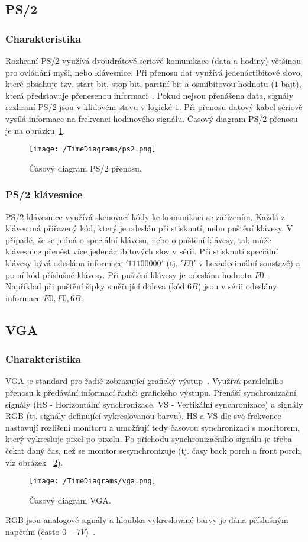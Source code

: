 \documentclass{report}
\begin{document}
\subsection{PS/2}\label{sec:ps2}
\subsubsection{Charakteristika}
Rozhraní PS/2 využívá dvoudrátové sériové komunikace (data a hodiny) většinou pro ovládání myši, nebo klávesnice. Při přenosu dat využívá jedenáctibitové slovo, které obsahuje tzv. start bit, stop bit, paritní bit a osmibitovou hodnotu ($1$ bajt), která představuje přenesenou informaci~\cite{ibmpc}. Pokud nejsou přenášena data, signály rozhraní PS/2 jsou v klidovém stavu v logické $1$. Při přenosu datový kabel sériově vysílá informace na frekvenci hodinového signálu. Časový diagram PS/2 přenosu je na obrázku~\ref{fig:ps2timing}.
\begin{figure}
\centering
\texttt{[image: /TimeDiagrams/ps2.png]}
\caption{Časový diagram PS/2 přenosu.}
\label{fig:ps2timing}
\end{figure}
\subsubsection{PS/2 klávesnice}
PS/2 klávesnice využívá skenovací kódy ke komunikaci se zařízením. Každá z kláves má přiřazený kód, který je odeslán při stisknutí, nebo puštění klávesy. V případě, že se jedná o speciální klávesu, nebo o puštění klávesy, tak může klávesnice přenést více jedenáctibitových slov v sérii. Při stisknutí speciální klávesy bývá odeslána informace $'11100000'$ (tj. $'E0'$ v hexadecimální soustavě) a po ní kód příslušné klávesy. Při puštění klávesy je odeslána hodnota $F0$. Například při puštění šipky směřující doleva (kód $6B$) jsou v sérii odeslány informace $E0,F0,6B$.
\subsection{VGA}\label{sec:vga}
\subsubsection{Charakteristika}
VGA je standard pro řadič zobrazující grafický výstup~\cite{ibmpc}. Využívá paralelního přenosu k předávání informací řadiči grafického výstupu. Přenáší synchronizační signály (HS - Horizontální synchronizace, VS - Vertikální synchronizace) a signály RGB (tj. signály definující vykreslovanou barvu). HS a VS dle své frekvence nastavují rozlišení monitoru a umožňují tedy časovou synchronizaci s monitorem, který vykresluje pixel po pixelu. Po příchodu synchronizačního signálu je třeba čekat daný čas, než se monitor sesynchronizuje (tj. časy back porch a front porch, viz obrázek ~\ref{fig:vgatiming}).
\begin{figure}
\centering
\texttt{[image: /TimeDiagrams/vga.png]}
\caption{Časový diagram VGA.}
\label{fig:vgatiming}
\end{figure}
RGB jsou analogové signály a hloubka vykreslované barvy je dána příslušným napětím (často $0 - 7V$)~\cite{ibmpc}.
\end{document}
